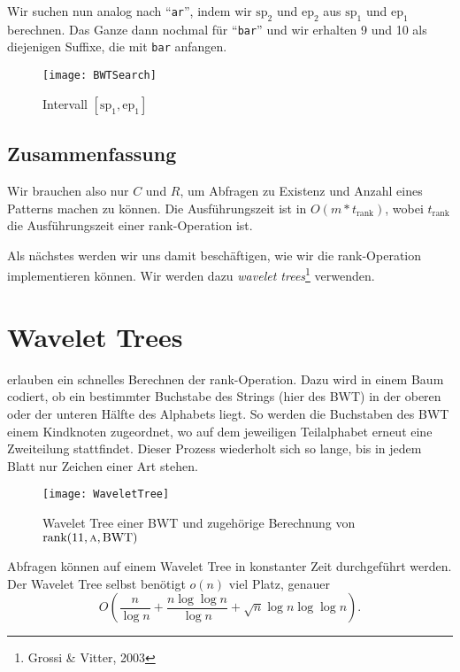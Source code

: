 \begin{minipage}{.7\textwidth}
  Wir suchen nun analog nach ``\texttt{ar}'', indem wir \( \text{sp}_2 \) und \( \text{ep}_2 \) aus \( \text{sp}_1 \) und \( \text{ep}_1 \) berechnen. Das Ganze dann nochmal für ``\texttt{bar}'' und wir erhalten 9 und 10 als diejenigen Suffixe, die mit \texttt{bar} anfangen.
\end{minipage}
\hfill
\begin{minipage}{.25\textwidth}
  \begin{figure}[H]
    \texttt{[image: BWTSearch]}
    \caption{Intervall \( [\text{sp}_1, \text{ep}_1] \)}
  \end{figure}
\end{minipage}

\subsection{Zusammenfassung}

Wir brauchen also nur \( C \) und \( R \), um Abfragen zu Existenz und Anzahl eines Patterns machen zu können. Die Ausführungszeit ist in \( O(m*t_{\text{rank}}) \), wobei \( t_{\text{rank}} \) die Ausführungszeit einer rank-Operation ist.

Als nächstes werden wir uns damit beschäftigen, wie wir die rank-Operation implementieren können. Wir werden dazu \emph{wavelet trees}\footnote{Grossi \& Vitter, 2003} verwenden.

\section{Wavelet Trees}

 erlauben ein schnelles Berechnen der rank-Operation. Dazu wird in einem Baum codiert, ob ein bestimmter Buchstabe des Strings (hier des BWT) in der oberen oder der unteren Hälfte des Alphabets liegt. So werden die Buchstaben des BWT einem Kindknoten zugeordnet, wo auf dem jeweiligen Teilalphabet erneut eine Zweiteilung stattfindet. Dieser Prozess wiederholt sich so lange, bis in jedem Blatt nur Zeichen einer Art stehen.

\begin{figure}[H]
  \texttt{[image: WaveletTree]}
  \caption{Wavelet Tree einer BWT und zugehörige Berechnung von \( \text{rank}(11, \textsc{a}, \text{BWT}) \)}
\end{figure}

Abfragen können auf einem Wavelet Tree in konstanter Zeit durchgeführt werden. Der Wavelet Tree selbst benötigt \( o(n) \) viel Platz, genauer
\begin{equation*}
  O\left( \frac{n}{\log n} + \frac{n \log \log n}{\log n} + \sqrt{n}\log n \log\log n \right)\text{.}
\end{equation*}

